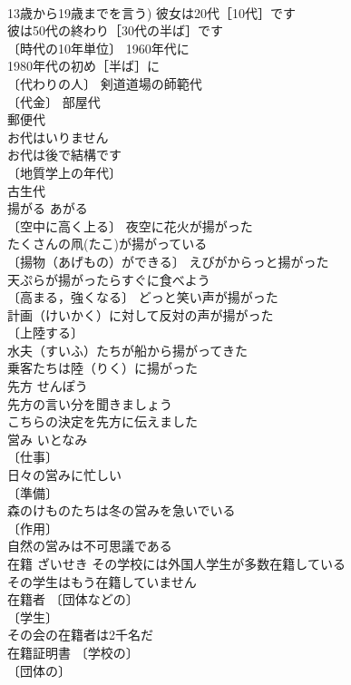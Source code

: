 \documentclass[8pt]{extreport}
\begin{document}
\begin{CJK}{UTF8}{min}
\\	13歳から19歳までを言う) 彼女は20代［10代］です 
\\	彼は50代の終わり［30代の半ば］です 
\\	〔時代の10年単位〕 1960年代に 
\\	1980年代の初め［半ば］に 
\\	〔代わりの人〕 剣道道場の師範代 
\\	〔代金〕 部屋代 
\\	郵便代 
\\	お代はいりません 
\\	お代は後で結構です 
\\	〔地質学上の年代〕
\\	古生代 
\\	揚がる	あがる	
\\	〔空中に高く上る〕 夜空に花火が揚がった 
\\	たくさんの凧(たこ)が揚がっている 
\\	〔揚物（あげもの）ができる〕 えびがからっと揚がった 
\\	天ぷらが揚がったらすぐに食べよう 
\\	〔高まる，強くなる〕 どっと笑い声が揚がった 
\\	計画（けいかく）に対して反対の声が揚がった 
\\	〔上陸する〕
\\	水夫（すいふ）たちが船から揚がってきた 
\\	乗客たちは陸（りく）に揚がった 
\\	先方	せんぽう	
\\	先方の言い分を聞きましょう 
\\	こちらの決定を先方に伝えました 
\\	営み	いとなみ	
\\	〔仕事〕
\\	日々の営みに忙しい 
\\	〔準備〕
\\	森のけものたちは冬の営みを急いでいる 
\\	〔作用〕
\\	自然の営みは不可思議である 
\\	在籍	ざいせき	その学校には外国人学生が多数在籍している 
\\	その学生はもう在籍していません 
\\	在籍者 〔団体などの〕
\\	〔学生〕
\\	その会の在籍者は2千名だ 
\\	在籍証明書 〔学校の〕
\\	〔団体の〕

\end{CJK}
\end{document}
